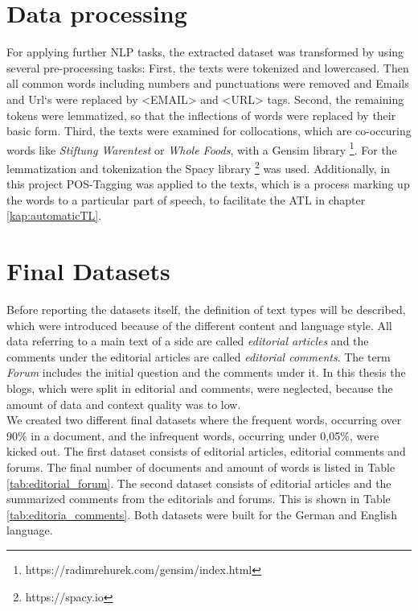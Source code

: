 \section{Data processing}
For applying further \ac{NLP} tasks, the extracted dataset was transformed by using several pre-processing tasks: First, the texts were tokenized and lowercased. Then all common words including numbers and punctuations were removed and Emails and Url`s were replaced by <EMAIL> and <URL> tags. Second, the remaining tokens were lemmatized, so that the inflections of words were replaced by their basic form. Third, the texts were examined for collocations, which are co-occuring words like \textit{Stiftung Warentest} or \textit{Whole Foods},  with a Gensim library \footnote{https://radimrehurek.com/gensim/index.html}. For the lemmatization and tokenization the Spacy library \footnote{https://spacy.io} was used.
Additionally, in this project \ac{POS}-Tagging was applied to the texts, which is a process marking up the words to a particular part of speech, to facilitate the \ac{ATL} in chapter \ref{kap:automaticTL}. 

\section{Final Datasets}
Before reporting the datasets itself, the definition of text types will be described, which were introduced because of the different content and language style. 
All data referring to a main text of a side are called \textit{editorial articles} and the comments under the editorial articles are called \textit{editorial comments}. The term \textit{Forum} includes the initial question and the comments under it.
In this thesis the blogs, which were split in editorial and comments, were neglected, because the amount of data and context quality was to low.\\

We created two different final datasets where the frequent words, occurring over 90\% in a document, and the infrequent words, occurring under 0,05\%, were kicked out.
The first dataset \label{chris:daten} consists of editorial articles, editorial comments and forums. The final number of documents and amount of words is listed in Table \ref{tab:editorial_forum}. The second dataset consists of editorial articles and the summarized comments from the editorials and forums. This is shown in Table \ref{tab:editoria_comments}. Both datasets were built for the German and English language. 

